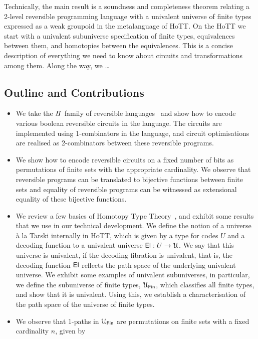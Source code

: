 Technically, the main result is a soundness and completeness theorem relating a 2-level reversible programming language with a univalent universe of finite types expressed as a weak groupoid in the metalanguage of HoTT. On the HoTT we start with a univalent subuniverse specification of finite types, equivalences between them, and homotopies between the equivalences. This is a concise description of everything we need to know about circuits and transformations among them. Along the way, we \ldots {}


\subsection*{Outline and Contributions}

\begin{itemize}[leftmargin=*]
  \item We take the $\mathit{\Pi}$ family of reversible languages~\cite{jamesInformationEffects2012} and show how to encode
        various boolean reversible circuits in the language. The circuits are implemented using 1-combinators in the
        language, and circuit optimisations are realised as 2-combinators between these reversible programs.
  \item We show how to encode reversible circuits on a fixed number of bits as permutations of finite sets with the
        appropriate cardinality. We observe that reversible programs can be translated to bijective functions between
        finite sets and equality of reversible programs can be witnessed as extensional equality of these bijective
        functions.
  \item We review a few basics of Homotopy Type Theory~\cite{univalentfoundationsprogramHomotopyTypeTheory2013}, and
        exhibit some results that we use in our technical development. We define the notion of a universe \`{a} la
        Tarski internally in HoTT, which is given by a type for codes $U$ and a decoding function to a univalent
        universe $\El : U \to \UU$. We say that this universe is univalent, if the decoding fibration is univalent, that
        is, the decoding function $\operatorname{\mathsf{El}}$ reflects the path space of the underlying univalent universe. We exhibit some
        examples of univalent subuniverses, in particular, we define the subuniverse of finite types, $\UFin$, which
        classifies all finite types, and show that it is univalent. Using this, we establish a characterisation of the
        path space of the universe of finite types.
  \item We observe that 1-paths in $\UFin$ are permutations on finite sets with a fixed cardinality $n$, given by

\end{itemize}
